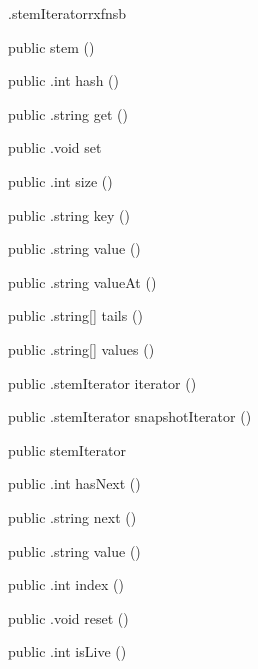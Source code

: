 \begin{CrexxClass}{.stemIterator}{rxfnsb}

  \begin{Hierarchy}
  \end{Hierarchy}

  \begin{Members}

    \Factory
      {public}
      {stem}
      {()}

    \Method
      {public}
      {.int}
      {hash}
      {()}

    \Method
      {public}
      {.string}
      {get}
      {()}

    \Method
      {public}
      {.void}
      {set}
      {}

    \Method
      {public}
      {.int}
      {size}
      {()}

    \Method
      {public}
      {.string}
      {key}
      {()}

    \Method
      {public}
      {.string}
      {value}
      {()}

    \Method
      {public}
      {.string}
      {valueAt}
      {()}

    \Method
      {public}
      {.string[]}
      {tails}
      {()}

    \Method
      {public}
      {.string[]}
      {values}
      {()}

    \Method
      {public}
      {.stemIterator}
      {iterator}
      {()}

    \Method
      {public}
      {.stemIterator}
      {snapshotIterator}
      {()}

    \Factory
      {public}
      {stemIterator}
      {}

    \Method
      {public}
      {.int}
      {hasNext}
      {()}

    \Method
      {public}
      {.string}
      {next}
      {()}

    \Method
      {public}
      {.string}
      {value}
      {()}

    \Method
      {public}
      {.int}
      {index}
      {()}

    \Method
      {public}
      {.void}
      {reset}
      {()}

    \Method
      {public}
      {.int}
      {isLive}
      {()}

  \end{Members}
\end{CrexxClass}

